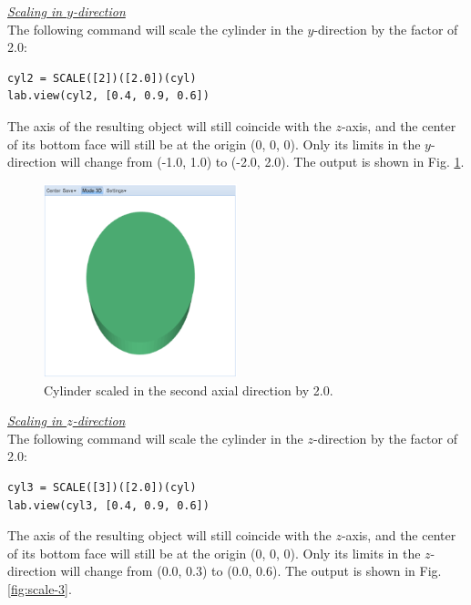 \documentclass[article,A4,12pt]{llncs}
\begin{document}
\noindent
\underline{\em Scaling in $y$-direction}\\

The following command will 
scale the cylinder in the $y$-direction by the factor of 2.0: 

\begin{verbatim}
cyl2 = SCALE([2])([2.0])(cyl)
lab.view(cyl2, [0.4, 0.9, 0.6])
\end{verbatim}
The axis of the resulting object will still
coincide with the $z$-axis, and the center of its bottom face will
still be at the origin (0, 0, 0). Only its limits in the $y$-direction will change 
from (-1.0, 1.0) to (-2.0, 2.0).
The output is shown in Fig. \ref{fig:scale-2}.

\newpage

\begin{figure}[!ht]
\begin{center}
\includegraphics[width=0.5\textwidth]{img/scale-2.png}
\end{center}
\vspace{-2mm}
\caption{Cylinder scaled in the second axial direction by 2.0.}
\label{fig:scale-2}
\end{figure}

\noindent
\underline{\em Scaling in $z$-direction}\\

The following command will 
scale the cylinder in the $z$-direction by the factor of 2.0: 

\begin{verbatim}
cyl3 = SCALE([3])([2.0])(cyl)
lab.view(cyl3, [0.4, 0.9, 0.6])
\end{verbatim}
The axis of the resulting object will still
coincide with the $z$-axis, and the center of its bottom face will
still be at the origin (0, 0, 0). Only its limits in the $z$-direction will change 
from (0.0, 0.3) to (0.0, 0.6). The output is shown in Fig. \ref{fig:scale-3}.
\end{document}
